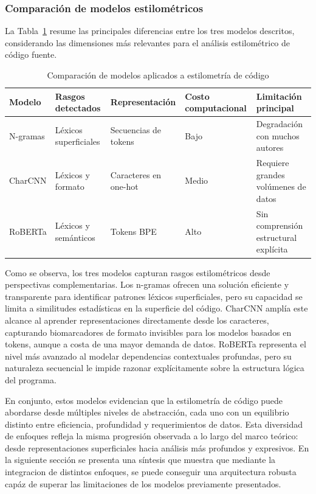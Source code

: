 \subsubsection{Comparación de modelos estilométricos}

La Tabla~\ref{tab:comparacion_estilometria} resume las principales diferencias 
entre los tres modelos descritos, considerando las dimensiones más relevantes 
para el análisis estilométrico de código fuente.

\begin{table}[htbp]
\centering
\caption{Comparación de modelos aplicados a estilometría de código}
\label{tab:comparacion_estilometria}
\small
\begin{tabularx}{\textwidth}{lXXXX}
\hline
\textbf{Modelo} & \textbf{Rasgos detectados} & \textbf{Representación} 
& \textbf{Costo computacional} & \textbf{Limitación principal} \\
\hline
N-gramas & Léxicos superficiales & Secuencias de tokens & Bajo 
& Degradación con muchos autores \\
CharCNN & Léxicos y formato & Caracteres en one-hot & Medio 
& Requiere grandes volúmenes de datos \\
RoBERTa & Léxicos y semánticos & Tokens BPE & Alto 
& Sin comprensión estructural explícita \\
\hline
\end{tabularx}
\end{table}

Como se observa, los tres modelos capturan rasgos estilométricos desde 
perspectivas complementarias. Los n-gramas ofrecen una solución eficiente y 
transparente para identificar patrones léxicos superficiales, pero su capacidad 
se limita a similitudes estadísticas en la superficie del código. CharCNN amplía 
este alcance al aprender representaciones directamente desde los caracteres, 
capturando biomarcadores de formato invisibles para los modelos basados en tokens, 
aunque a costa de una mayor demanda de datos. RoBERTa representa el nivel más 
avanzado al modelar dependencias contextuales profundas, pero su naturaleza 
secuencial le impide razonar explícitamente sobre la estructura lógica del 
programa.

En conjunto, estos modelos evidencian que la estilometría de código puede 
abordarse desde múltiples niveles de abstracción, cada uno con un equilibrio 
distinto entre eficiencia, profundidad y requerimientos de datos. Esta diversidad 
de enfoques refleja la misma progresión observada a lo largo del marco teórico: 
desde representaciones superficiales hacia análisis más profundos y expresivos. 
En la siguiente sección se presenta una síntesis que muestra que mediante la integracion de distintos enfoques, se puede conseguir una arquitectura robusta capáz de superar las limitaciones de los modelos previamente presentados. 


